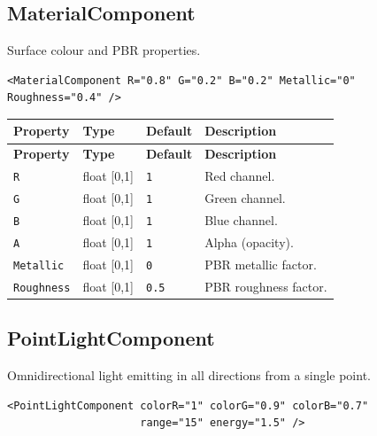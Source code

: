 \documentclass[11pt,a4paper]{article}
\begin{document}
\subsection{MaterialComponent}

Surface colour and PBR properties.

\begin{lstlisting}
<MaterialComponent R="0.8" G="0.2" B="0.2" Metallic="0" Roughness="0.4" />
\end{lstlisting}

\begin{longtable}{P{3cm} P{2cm} P{2.5cm} P{5.5cm}}
  \toprule
  \textbf{Property} & \textbf{Type} & \textbf{Default} & \textbf{Description} \\
  \midrule
  \endfirsthead
  \toprule
  \textbf{Property} & \textbf{Type} & \textbf{Default} & \textbf{Description} \\
  \midrule
  \endhead
  \texttt{R} & float [0,1] & \texttt{1} & Red channel. \\
  \texttt{G} & float [0,1] & \texttt{1} & Green channel. \\
  \texttt{B} & float [0,1] & \texttt{1} & Blue channel. \\
  \texttt{A} & float [0,1] & \texttt{1} & Alpha (opacity). \\
  \texttt{Metallic} & float [0,1] & \texttt{0} & PBR metallic factor. \\
  \texttt{Roughness} & float [0,1] & \texttt{0.5} & PBR roughness factor. \\
  \bottomrule
\end{longtable}

\subsection{PointLightComponent}

Omnidirectional light emitting in all directions from a single point.

\begin{lstlisting}
<PointLightComponent colorR="1" colorG="0.9" colorB="0.7"
                     range="15" energy="1.5" />
\end{lstlisting}
\end{document}

